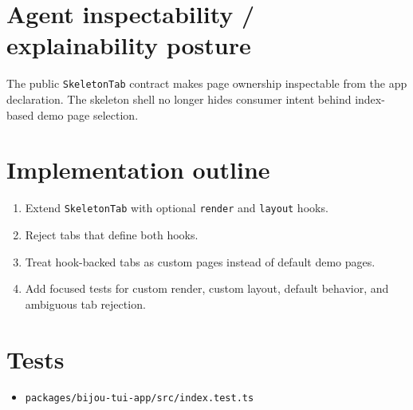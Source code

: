 \section{Agent inspectability / explainability posture}\label{record-130-agent-inspectability-explainability-posture}

The public \texttt{S\allowbreak{}k\allowbreak{}e\allowbreak{}l\allowbreak{}e\allowbreak{}t\allowbreak{}o\allowbreak{}n\allowbreak{}T\allowbreak{}a\allowbreak{}b} contract makes page ownership inspectable from the app declaration. The skeleton shell no longer hides consumer intent behind index-based demo page selection.

\section{Implementation outline}\label{record-130-implementation-outline}

\begin{enumerate}
\def\labelenumi{\arabic{enumi}.}
\tightlist
\item
  Extend \texttt{S\allowbreak{}k\allowbreak{}e\allowbreak{}l\allowbreak{}e\allowbreak{}t\allowbreak{}o\allowbreak{}n\allowbreak{}T\allowbreak{}a\allowbreak{}b} with optional \texttt{r\allowbreak{}e\allowbreak{}n\allowbreak{}d\allowbreak{}e\allowbreak{}r} and \texttt{l\allowbreak{}a\allowbreak{}y\allowbreak{}o\allowbreak{}u\allowbreak{}t} hooks.
\item
  Reject tabs that define both hooks.
\item
  Treat hook-backed tabs as custom pages instead of default demo pages.
\item
  Add focused tests for custom render, custom layout, default behavior, and ambiguous tab rejection.
\end{enumerate}

\section{Tests}\label{record-130-tests}

\begin{itemize}
\tightlist
\item
  \texttt{p\allowbreak{}a\allowbreak{}c\allowbreak{}k\allowbreak{}a\allowbreak{}g\allowbreak{}e\allowbreak{}s\allowbreak{}/\allowbreak{}b\allowbreak{}i\allowbreak{}j\allowbreak{}o\allowbreak{}u\allowbreak{}-\allowbreak{}t\allowbreak{}u\allowbreak{}i\allowbreak{}-\allowbreak{}a\allowbreak{}p\allowbreak{}p\allowbreak{}/\allowbreak{}s\allowbreak{}r\allowbreak{}c\allowbreak{}/\allowbreak{}i\allowbreak{}n\allowbreak{}d\allowbreak{}e\allowbreak{}x\allowbreak{}.\allowbreak{}t\allowbreak{}e\allowbreak{}s\allowbreak{}t\allowbreak{}.\allowbreak{}t\allowbreak{}s}
\end{itemize}

